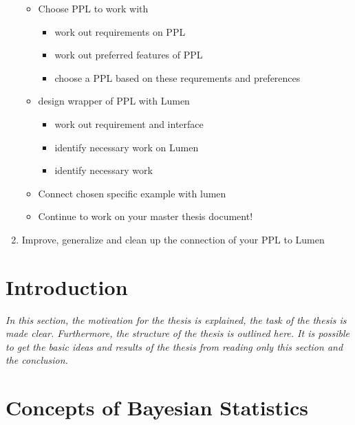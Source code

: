 \documentclass{article}
\begin{document}
\begin{enumerate}
\begin{itemize}
		\item Choose PPL to work with
		\begin {itemize}
		\item work out requirements on PPL
		\item work out preferred features of PPL
		\item choose a PPL based on these requrements and preferences
	\end{itemize}
	\item design wrapper of PPL with Lumen
	\begin{itemize}
		\item work out requirement and interface
		\item identify necessary work on Lumen
		\item identify necessary work
	\end{itemize}
	\item Connect chosen specific example with lumen
	\item Continue to work on your master thesis document!
\end{itemize}
\item Improve, generalize and clean up the connection of your PPL to Lumen
\end{enumerate}

\section{Introduction}

\textit{In this section, the motivation for the thesis is explained, the task of the thesis is made clear. Furthermore, the structure of the thesis is outlined here. It is possible to get the basic ideas and results of the thesis from reading only this section and the conclusion.}

\section{Concepts of Bayesian Statistics}
\end{document}
